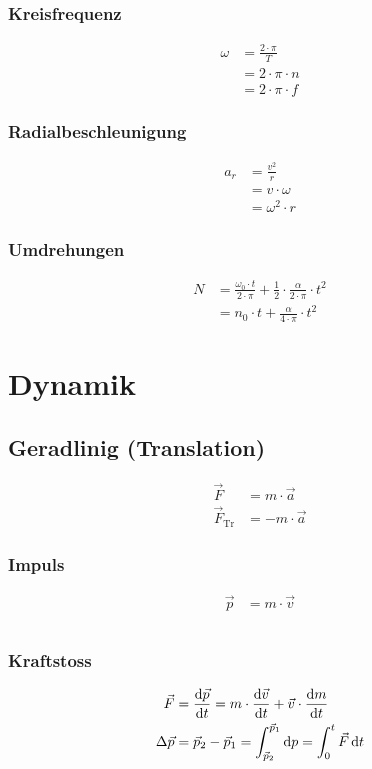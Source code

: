 \begin{multicols}{2}{}
\subsubsection*{Kreisfrequenz}
\begin{align*}
\omega&=\frac{2\cdot\pi}{T}\\
&=2\cdot\pi\cdot n \\
&=2\cdot\pi\cdot f
\end{align*}


\subsubsection*{Radialbeschleunigung}
\begin{align*}
a_r&=\frac{v^2}{r}\\
&=v\cdot\omega\\
&=\omega^2\cdot r
\end{align*}
\end{multicols}


\subsubsection*{Umdrehungen}
\begin{align*}
N&=\frac{\omega_0\cdot t}{2\cdot \pi}+\frac{1}{2}\cdot\frac{\alpha}{2\cdot \pi}\cdot t^2\\
&=n_0\cdot t+\frac{\alpha}{4\cdot\pi}\cdot t^2
\end{align*}


\newpage
\section{Dynamik}

\subsection{Geradlinig (Translation)}
\begin{align*}
\vec{F}&=m\cdot \vec{a}\\
\vec{F}_{\text{Tr}}&=-m\cdot \vec{a}
\end{align*}
\begin{multicols}{2}{}
\subsubsection*{Impuls}
\begin{align*}
\vec{p}&=m\cdot \vec{v}\\ \\
\end{align*}

\subsubsection*{Kraftstoss}
\begin{align*}
\vec{F}&=\frac{\diff \vec{p}}{\diff t}=m\cdot\frac{\diff \vec{v}}{\diff t}+\vec{v}\cdot\frac{\diff m}{\diff t}\\
\Delta\vec{p}&=\vec{p}_2-\vec{p}_1=\int_{\vec{p}_2}^{\vec{p}_1}\diff p=\int_0^{t}\vec{F}\diff t
\end{align*}
\end{multicols}

